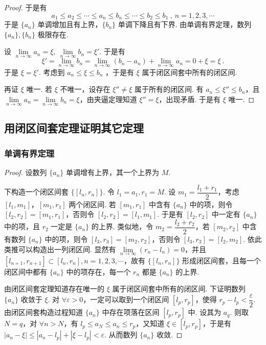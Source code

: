 \documentclass[zihao=-4,linespread=1.8,UTF8,nothm]{aytony_base}
\theoremstyle{definition}
\begin{document}
\begin{appendices}
\begin{proof}
        于是有 $$
            a_1 \leqslant a_2 \leqslant \cdots \leqslant a_n \leqslant b_n \leqslant \cdots \leqslant b_2 \leqslant b_1\ ,\ n = 1, 2, 3, \cdots
        $$ 于是 $\{a_n\}$ 单调增加且有上界，$\{b_n\}$ 单调下降且有下界. 由单调有界定理，数列 $\{a_n\}, \{b_n\}$ 极限存在.

        设 $\lim\limits_{n \to \infty} a_n = \xi,\ \lim\limits_{n \to \infty} b_n = \xi'$. 于是有 $$
            \xi' = \lim\limits_{n \to \infty} b_n = \lim\limits_{n \to \infty} (b_n - a_n) + \lim\limits_{n \to \infty} a_n = 0 + \xi = \xi\ .
        $$ 于是 $\xi = \xi'$. 考虑到 $a_n \leqslant \xi \leqslant b_n$ ，于是有 $\xi$ 属于闭区间套中所有的闭区间.

        再证 $\xi$ 唯一. 若 $\xi$ 不唯一，设存在 $\xi'' \neq \xi$ 属于所有的闭区间. 有 $a_n \leqslant \xi'' \leqslant b_n$，且 $\lim\limits_{n \to \infty} a_n = \lim\limits_{n \to \infty} b_n = \xi$，由夹逼定理知道 $\xi'' = \xi$，出现矛盾. 于是有 $\xi$ 唯一.
    \end{proof}

    \subsection{用闭区间套定理证明其它定理}

    \subsubsection{单调有界定理}

    \begin{proof}
        设数列 $\{a_n\}$ 单调增有上界，其一个上界为 $M$.

        下构造一个闭区间套 $\{[l_n, r_n]\}$. 令 $l_1 = a_1, r_1 = M$. 设 $m_1 = \dfrac{l_1 + r_1}{2}$，考虑 $[l_1, m_1]$，$[m_1, r_1]$ 两个闭区间. 若 $[m_1, r_1]$ 中含有 $\{a_n\}$ 中的项，则令 $[l_2, r_2] = [m_1, r_1]$，否则令 $[l_2, r_2] = [l_1, m_1]$. 于是有 $[l_2, r_2]$ 中一定有 $\{a_n\}$ 中的项，且 $r_2$ 一定是 $\{a_n\}$ 的上界. 类似地，令 $m_2 = \dfrac{l_2 + r_2}{2}$，若 $[m_2, r_2]$ 中含有数列 $\{a_n\}$ 中的项，则令 $[l_3, r_3] = [m_2, r_2]$，否则令 $[l_3, r_3] = [l_2, m_2]$. 依此类推可以构造出一列闭区间. 显然有 $\lim\limits_{n \to \infty} (r_n - l_n) = 0$，并且 $[l_{n+1}, r_{n+1}] \subset [l_n, r_n], n = 1, 2, 3, \cdots$，故有 $\{[l_n, r_n]\}$ 形成闭区间套，且每一个闭区间中都有 $\{a_n\}$ 中的项存在，每一个 $r_n$ 都是 $\{a_n\}$ 的上界.

        由闭区间套定理知道存在唯一的 $\xi$ 属于闭区间套中所有的闭区间. 下证明数列 $\{a_n\}$ 收敛于 $\xi$. 对 $\forall \varepsilon > 0$，一定可以取到一个闭区间 $[l_p, r_p]$，使得 $r_p - l_p < \dfrac{\varepsilon}{2}$. 由闭区间套构造过程知道 $\{a_n\}$ 中存在项落在区间 $[l_p, r_p]$ 中. 设其为 $a_q$. 则取 $N = q$，对 $\forall n > N$，有 $l_p \leqslant a_N \leqslant a_n \leqslant r_p$，又知道 $\xi \in [l_p, r_p]$，于是有 $|a_n - \xi| \leqslant |a_n - l_p| + |\xi - l_p| < \varepsilon$. 从而数列 $\{a_n\}$ 收敛.
    \end{proof}


\end{appendices}
\end{document}

